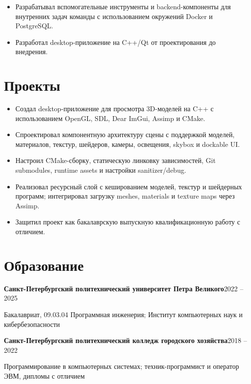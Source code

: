 \begin{itemize}
  \item Разрабатывал вспомогательные инструменты и backend-компоненты для внутренних задач команды с использованием окружений Docker и PostgreSQL.
\end{itemize}

\begin{itemize}
  \item Разработал desktop-приложение на C++/Qt от проектирования до внедрения.
\end{itemize}

\section*{Проекты}

\begin{itemize}
  \item Создал desktop-приложение для просмотра 3D-моделей на C++ с использованием OpenGL, SDL, Dear ImGui, Assimp и CMake.
  \item Спроектировал компонентную архитектуру сцены с поддержкой моделей, материалов, текстур, шейдеров, камеры, освещения, skybox и dockable UI.
  \item Настроил CMake-сборку, статическую линковку зависимостей, Git submodules, runtime assets и настройки sanitizer/debug.
  \item Реализовал ресурсный слой с кешированием моделей, текстур и шейдерных программ; интегрировал загрузку meshes, materials и texture maps через Assimp.
  \item Защитил проект как бакалаврскую выпускную квалификационную работу с отличием.
\end{itemize}

\section*{Образование}

\textbf{Санкт-Петербургский политехнический университет Петра Великого}\hfill 2022 -- 2025\par
Бакалавриат, 09.03.04 Программная инженерия; Институт компьютерных наук и кибербезопасности\par
\tightvspace
\textbf{Санкт-Петербургский политехнический колледж городского хозяйства}\hfill 2018 -- 2022\par
Программирование в компьютерных системах; техник-программист и оператор ЭВМ, дипломы с отличием
